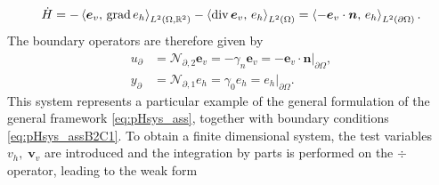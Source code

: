 \begin{equation}
\dot{H} = - \inner[L^2(\Omega, \mathbb{R}^2)]{\bm{e}_v}{\grad e_h} - \inner[L^2(\Omega)]{\div \bm{e}_v}{e_h} = \inner[L^2(\partial\Omega)]{- \bm{e}_v \cdot\bm{n}}{e_h}.
\end{equation}
The boundary operators are therefore given by 
\begin{equation}
\begin{aligned}
u_\partial &= \mathcal{N}_{\partial, 2} \bm{e}_v = -\gamma_{n} \bm{e}_v = -\bm{e}_v \cdot \bm{n}\vert_{\partial\Omega}, \\ 
y_\partial &= \mathcal{N}_{\partial, 1} {e}_h = \gamma_{0} {e}_h = {e}_h\vert_{\partial\Omega}.
\end{aligned}
\end{equation}
This system represents a particular example of the general formulation of the general framework \eqref{eq:pHsys_ass}, together with boundary conditions \eqref{eq:pHsys_assB2C1}. To obtain a finite dimensional system, the test variables $v_h,\; \bm{v}_v$ are introduced and the integration by parts is performed on the $\div$ operator, leading to the weak form 

